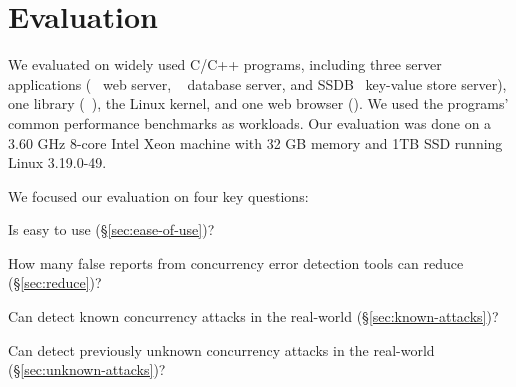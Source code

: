 \section{Evaluation}
\label{sec:evaluation}

We evaluated \xxx on \nreproducedProgs widely used C/C++ programs, including 
three server applications (\apache~\cite{apache} web server, 
\mysql~\cite{mysql} database server, and SSDB~\cite{SSDB} 
key-value store server), one library (\libsafe~\cite{libsafe}), the Linux 
kernel, and one web browser (\chrome). We used the programs' common performance 
benchmarks as workloads. Our evaluation was done on a 3.60 GHz 8-core 
Intel Xeon machine with 32 GB memory and 1TB SSD running Linux 3.19.0-49. 


We focused our evaluation on four key questions:
\begin{tightenum}

\item Is \xxx easy to use (\S\ref{sec:ease-of-use})?


\item How many false reports from concurrency error 
detection tools can \xxx reduce (\S\ref{sec:reduce})?

\item Can \xxx detect known concurrency attacks in the real-world
(\S\ref{sec:known-attacks})?

\item Can \xxx detect previously unknown concurrency attacks in the real-world
(\S\ref{sec:unknown-attacks})?



\end{tightenum}

